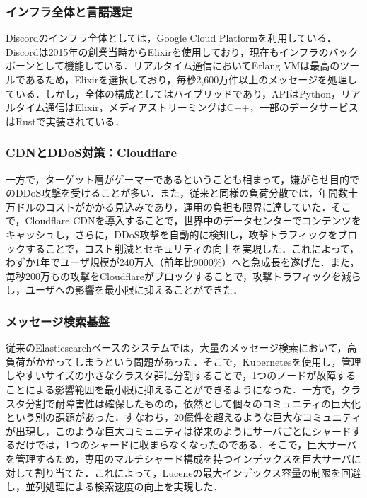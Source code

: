 \documentclass[a4paper,12pt]{article}
\begin{document}
\subsubsection{インフラ全体と言語選定}

Discordのインフラ全体としては，Google Cloud Platformを利用している\cite{discord-cloudflare}．Discordは2015年の創業当時からElixirを使用しており，現在もインフラのバックボーンとして機能している．リアルタイム通信においてErlang VMは最高のツールであるため，Elixirを選択しており，毎秒2,600万件以上のメッセージを処理している\cite{discord-elixir-scale}．しかし，全体の構成としてはハイブリッドであり，APIはPython，リアルタイム通信はElixir，メディアストリーミングはC++，一部のデータサービスはRustで実装されている．

\subsubsection{CDNとDDoS対策：Cloudflare}

一方で，ターゲット層がゲーマーであるということも相まって，嫌がらせ目的でのDDoS攻撃を受けることが多い．また，従来と同様の負荷分散では，年間数十万ドルのコストがかかる見込みであり，運用の負担も限界に達していた．そこで，Cloudflare CDNを導入することで，世界中のデータセンターでコンテンツをキャッシュし，さらに，DDoS攻撃を自動的に検知し，攻撃トラフィックをブロックすることで，コスト削減とセキュリティの向上を実現した\cite{discord-cloudflare}．これによって，わずか1年でユーザ規模が240万人（前年比9000\%）へと急成長を遂げた．また，毎秒200万もの攻撃をCloudflareがブロックすることで，攻撃トラフィックを減らし，ユーザへの影響を最小限に抑えることができた\cite{discord-cloudflare}．

\subsubsection{メッセージ検索基盤}

従来のElasticsearchベースのシステムでは，大量のメッセージ検索において，高負荷がかかってしまうという問題があった．そこで，Kubernetesを使用し，管理しやすいサイズの小さなクラスタ群に分割することで，1つのノードが故障することによる影響範囲を最小限に抑えることができるようになった\cite{discord-indexes-trillions}．一方で，クラスタ分割で耐障害性は確保したものの，依然として個々のコミュニティの巨大化という別の課題があった．すなわち，20億件を超えるような巨大なコミュニティが出現し，このような巨大コミュニティは従来のようにサーバごとにシャードするだけでは，1つのシャードに収まらなくなったのである．そこで，巨大サーバを管理するため，専用のマルチシャード構成を持つインデックスを巨大サーバに対して割り当てた．これによって，Luceneの最大インデックス容量の制限を回避し，並列処理による検索速度の向上を実現した．
\end{document}
